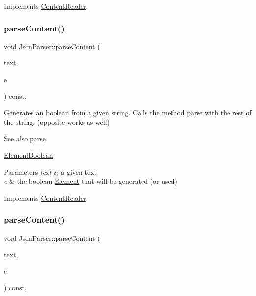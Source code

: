 Implements \mbox{\hyperlink{classContentReader_a310678ddc37a05aca2f13db73b22abe5}{Content\+Reader}}.

\mbox{\label{classJsonParser_a0857f5d286e5f0b973e2791e5e7a4e83}} 
\subsubsection{\texorpdfstring{parse\+Content()}{parseContent()}\hspace{0.1cm}{\footnotesize\ttfamily [3/6]}}
{\footnotesize\ttfamily void Json\+Parser\+::parse\+Content (\begin{DoxyParamCaption}\item[{std\+::string \&}]{text,  }\item[{\mbox{\hyperlink{classElementBoolean}{Element\+Boolean}} $\ast$}]{e }\end{DoxyParamCaption}) const\hspace{0.3cm}{\ttfamily [override]}, {\ttfamily [virtual]}}

Generates an boolean from a given string. Calls the method parse with the rest of the string. (opposite works as well) \begin{DoxySeeAlso}{See also}
\mbox{\hyperlink{classJsonParser_a3ec3a9fcc8a63f987b4749d60b0568df}{parse}} 

\mbox{\hyperlink{classElementBoolean}{Element\+Boolean}}
\end{DoxySeeAlso}

\begin{DoxyParams}{Parameters}
{\em text} & a given text \\
\hline
{\em e} & the boolean \mbox{\hyperlink{classElement}{Element}} that will be generated (or used) \\
\hline
\end{DoxyParams}


Implements \mbox{\hyperlink{classContentReader_a3ee0aec579c723f17742e10fe7c75e39}{Content\+Reader}}.

\mbox{\label{classJsonParser_aa728c443b247b83cdf6cedb406d8940d}} 
\subsubsection{\texorpdfstring{parse\+Content()}{parseContent()}\hspace{0.1cm}{\footnotesize\ttfamily [4/6]}}
{\footnotesize\ttfamily void Json\+Parser\+::parse\+Content (\begin{DoxyParamCaption}\item[{std\+::string \&}]{text,  }\item[{\mbox{\hyperlink{classElementArray}{Element\+Array}} $\ast$}]{e }\end{DoxyParamCaption}) const\hspace{0.3cm}{\ttfamily [override]}, {\ttfamily [virtual]}}

